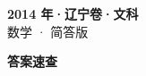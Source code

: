 \documentclass[zihao=-4, a4paper]{ctexart}
\begin{document}
\begin{center}
  {\Large\bfseries 2014 年·辽宁卷·文科}\\[4pt]
  {\large 数学 · 简答版}
\end{center}
\medskip
{}

\clearpage
{}
\begin{center}{\Large\bfseries 答案速查}\end{center}
\medskip

\end{document}
